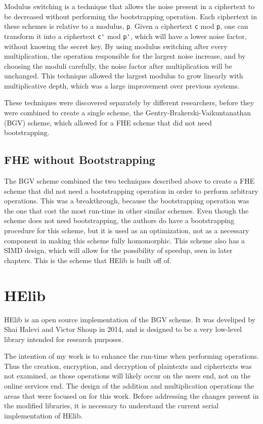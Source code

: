 Modulus switching \cite{coron2012public} is a technique that allows the noise present in a ciphertext to be decreased without performing the bootstrapping operation. Each ciphertext in these schemes is relative to a modulus, \verb|p|. Given a ciphertext \verb|c| mod \verb|p|, one can transform it into a ciphertext \verb|c'| mod \verb|p'|, which will have a lower noise factor, without knowing the secret key. By using modulus switching after every multiplication, the operation responsible for the largest noise increase, and by choosing the moduli carefully, the noise factor after multiplication will be unchanged. This technique allowed the largest modulus to grow linearly with multiplicative depth, which was a large improvement over previous systems.

These techniques were discovered separately by different researchers, before they were combined to create a single scheme, the Gentry-Brakerski-Vaikuntanathan (BGV) scheme, which allowed for a FHE scheme that did not need bootstrapping.

\subsection{FHE without Bootstrapping}
The BGV scheme \cite{cryptoeprint:2011:277} combined the two techniques described above to create a FHE scheme that did not need a bootstrapping operation in order to perform arbitrary operations. This was a breakthrough, because the bootstrapping operation was the one that cost the most run-time in other similar schemes. Even though the scheme does not need bootstrapping, the authors do have a bootstrapping procedure for this scheme, but it is used as an optimization, not as a necessary component in making this scheme fully homomorphic. This scheme also has a SIMD design, which will allow for the possibility of speedup, seen in later chapters. This is the scheme that HElib is built off of.

\section{HElib}
HElib \cite{cryptoeprint:2014:106} \cite{cryptoeprint:2014:873} \cite{halevi2013design} is an open source implementation of the BGV scheme. It was develiped by Shai Halevi and Victor Shoup in 2014, and is designed to be a very low-level library intended for research purposes. 

The intention of my work is to enhance the run-time when performing operations. Thus the creation, encryption, and decryption of plaintexts and ciphertexts was not examined, as those operations will likely occur on the users end, not on the online services end. The design of the addition and multiplication operations the areas that were focused on for this work. Before addressing the changes present in the modified libraries, it is necessary to understand the current serial implementation of HElib. 

